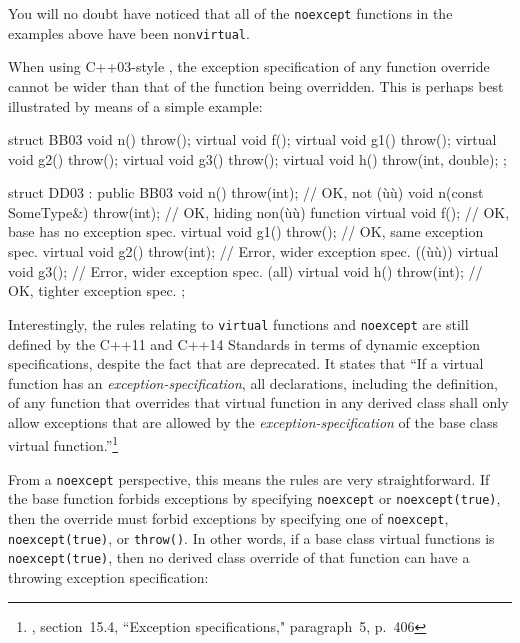 You will no doubt have noticed that all of the \lstinline!noexcept!
functions in the examples above have been non\lstinline!virtual!.

When using C++03-style , the
exception specification of any function override cannot be wider than
that of the function being overridden. This is perhaps best illustrated
by means of a simple example:

\begin{emcppslisting}
struct BB03
{
    void n() throw();
    virtual void f();
    virtual void g1() throw();
    virtual void g2() throw();
    virtual void g3() throw();
    virtual void h() throw(int, double);
};

struct DD03 : public BB03
{
    void n() throw(int);                // OK, not (ù{}ù)
    void n(const SomeType&) throw(int); // OK, hiding non(ù{}ù) function
    virtual void f();                   // OK, base has no exception spec.
    virtual void g1() throw();          // OK, same exception spec.
    virtual void g2() throw(int);       // Error, wider exception spec. ((ù{}ù))
    virtual void g3();                  // Error, wider exception spec. (all)
    virtual void h() throw(int);        // OK, tighter exception spec.
};
\end{emcppslisting}
    

\noindent Interestingly, the rules relating to \lstinline!virtual! functions and
\lstinline!noexcept! are still defined by the C++11 and C++14 Standards in
terms of dynamic exception specifications, despite the fact that
 are deprecated. It states that
``If a virtual function has an \emph{exception-specification}, all
declarations, including the definition, of any function that overrides
that virtual function in any derived class shall only allow exceptions
that are allowed by the \emph{exception-specification} of the base class
virtual function.''{\cprotect\footnote{\cite{iso11}, section~15.4, ``Exception specifications," paragraph~5, p.~406}}

From a \lstinline!noexcept! perspective, this means the rules are very
straightforward. If the base function forbids exceptions by specifying
\lstinline!noexcept! or \lstinline!noexcept(true)!, then the override must
forbid exceptions by specifying one of \lstinline!noexcept!,
\lstinline!noexcept(true)!, or \lstinline!throw()!. In other words, if a base
class virtual functions is \lstinline!noexcept(true)!, then no derived
class override of that function can have a throwing exception
specification:

